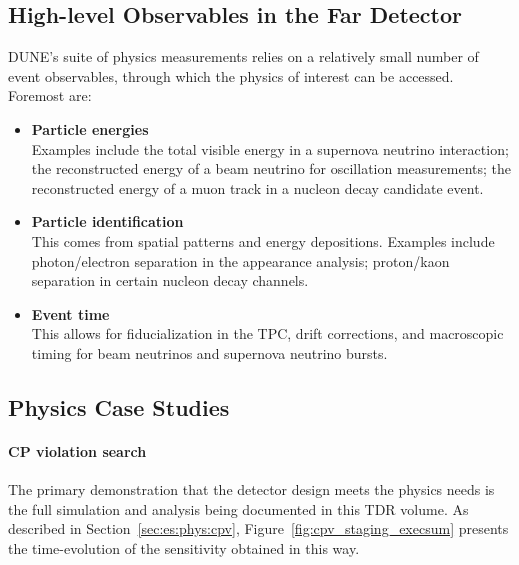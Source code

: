 \subsection{High-level Observables in the Far Detector}

DUNE's suite of physics measurements relies on a relatively small
number of event observables, through which the physics of interest
can be accessed.  Foremost are:
%                                                                                                
\begin{itemize}
\item {\bf Particle energies}  \\
Examples include the total visible energy in a supernova
neutrino interaction; the reconstructed energy of a beam
neutrino for oscillation measurements; the reconstructed
energy of a muon track in a nucleon decay candidate event.

\item {\bf Particle identification}  \\
This comes from spatial patterns and energy depositions.
Examples include photon/electron separation in the \nue{}
appearance analysis; proton/kaon separation in certain
nucleon decay channels.

\item {\bf Event time} \\
This allows for fiducialization
in the TPC, drift corrections, and macroscopic timing for
beam neutrinos and supernova neutrino bursts.
\end{itemize}



\subsection{Physics Case Studies}

\paragraph{\bf CP violation search}
The primary demonstration that the detector design meets
the physics needs is the full simulation and analysis
being documented in this TDR volume.  As described in 
Section~\ref{sec:es:phys:cpv}, 
Figure~\ref{fig:cpv_staging_execsum}
presents the time-evolution of the  sensitivity 
obtained in this way.


